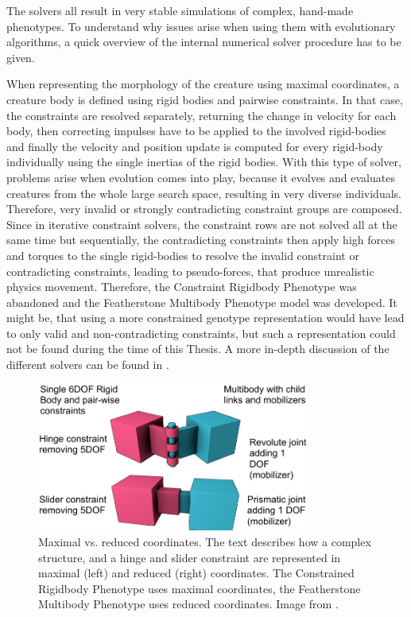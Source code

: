 \documentclass[main]{subfiles}
\begin{document}
The solvers all result in very stable simulations of complex, hand-made phenotypes. %
%
To understand why issues arise when using them with evolutionary algorithms, a quick overview of the internal numerical solver procedure has to be given. 

When representing the morphology of the creature using maximal coordinates, a creature body is defined using rigid bodies and pairwise constraints. %
%
In that case, the constraints are resolved separately, returning the change in velocity for each body, then correcting impulses have to be applied to the involved rigid-bodies and finally the velocity and position update is computed for every rigid-body individually using the single inertias of the rigid bodies. %
%
With this type of solver, problems arise when evolution comes into play, because it evolves and evaluates creatures from the whole large search space, resulting in very diverse individuals. %
%
Therefore, very invalid or strongly contradicting constraint groups are composed. %
%
Since in iterative constraint solvers, the constraint rows are not solved all at the same time but sequentially, the contradicting constraints then apply high forces and torques to the single rigid-bodies to resolve the invalid constraint or contradicting constraints, leading to pseudo-forces, that produce unrealistic physics movement. %
%
Therefore, the Constraint Rigidbody Phenotype was abandoned and the Featherstone Multibody Phenotype model was developed. %
%
It might be, that using a more constrained genotype representation would have lead to only valid and non-contradicting constraints, but such a representation could not be found during the time of this Thesis. %
%
A more in-depth discussion of the different solvers can be found in \cite{bib::Coumans2014}.

\begin{figure}[H]
\centering
\includegraphics[width=0.8\textwidth]{Pictures/evolutionary-optimization/maximal-vs-reduced-coordinates.pdf}

\caption[Maximal vs. reduced coordinates]{Maximal vs. reduced coordinates. The text describes how a complex structure, and a hinge and slider constraint are represented in maximal (left) and reduced (right) coordinates. The Constrained Rigidbody Phenotype uses maximal coordinates, the Featherstone Multibody Phenotype uses reduced coordinates. Image from \cite{bib::Coumans2014}.}
\label{figure:maximal-vs-reduced}
\end{figure}
\end{document}
